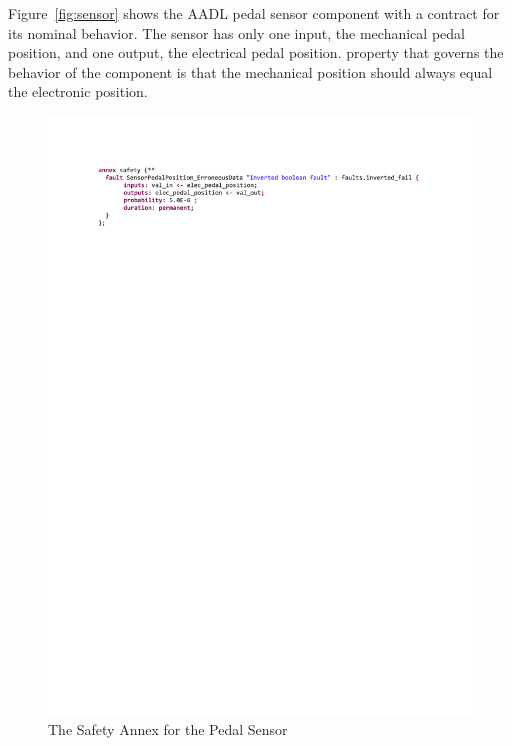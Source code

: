 Figure~\ref{fig:sensor} shows the AADL pedal sensor component with a contract for its nominal behavior. The sensor has only one input, the mechanical pedal position, and one output, the electrical pedal position. %
 property that governs the behavior of the component is that the mechanical position should always equal the electronic position. 

\begin{figure}[h!]
	\hspace*{-2cm}
	\vspace{-0.5in} 
	\begin{center}
		\includegraphics[trim=0 690 -10 70,clip,width=1.5\dimexpr\textwidth-2cm\relax]{images/safetyannex_sensorfault.pdf}
		\vspace{-0.3in}
		\caption{The Safety Annex for the Pedal Sensor}
		\label{fig:sensorFault}
	\end{center}
	\vspace{-0.3in}
\end{figure}

